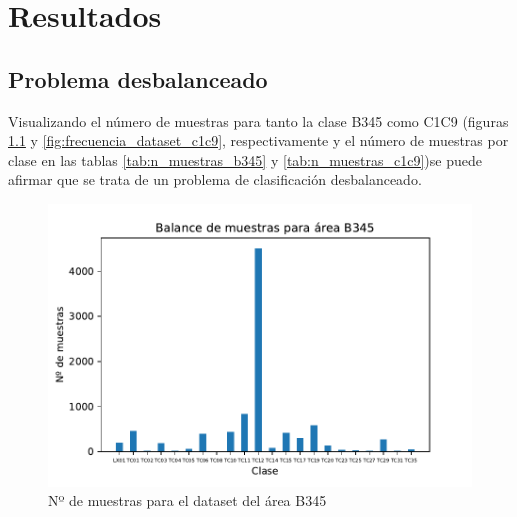 \chapter{Resultados}

\section{Problema desbalanceado}

Visualizando el número de muestras para tanto la clase B345 como C1C9 (figuras \ref{fig:frecuencia_dataset_b345} y \ref{fig:frecuencia_dataset_c1c9}, respectivamente y el número de muestras por clase en las tablas \ref{tab:n_muestras_b345} y \ref{tab:n_muestras_c1c9})se puede afirmar que se trata de un problema de clasificación desbalanceado.

\begin{figure}[H]
	\centering
	\captionsetup{justification=centering}
	\includegraphics[width=\textwidth]{imagenes/resultados/balance/B345.pdf}
	\caption{Nº de muestras para el dataset del área B345}
	\label{fig:frecuencia_dataset_b345}
\end{figure}

